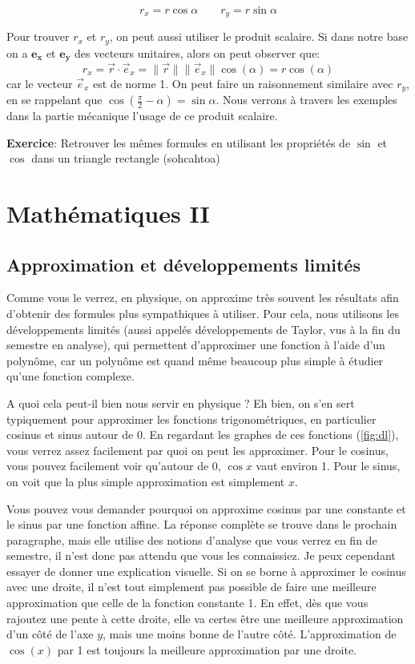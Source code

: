 \documentclass{article}
\begin{document}
\[\boxed{ r_x = r \cos{\alpha}\qquad r_y = r \sin{\alpha}} \]

\vspace{0.3cm}


\noindent Pour trouver $r_x$ et $r_y$, on peut aussi utiliser le produit scalaire. Si dans notre base on a $\mathbf{e_x}$ et $\mathbf{e_y}$ des vecteurs unitaires, alors on peut observer que:
\[r_x=\vec{r} \cdot \vec{e}_x=\lVert \vec{r}\rVert \lVert \vec{e}_x\rVert \cos{(\alpha)}=r\cos{(\alpha)}\]
car le vecteur $\vec{e}_x$ est de norme 1. On peut faire un raisonnement similaire avec $r_y$, en se rappelant que $\cos{(\frac{\pi}{2}-\alpha)} = \sin{\alpha}$. Nous verrons à travers les exemples dans la partie mécanique l'usage de ce produit scalaire. 



\noindent\textbf{Exercice}: Retrouver les mêmes formules en utilisant les propriétés de $\sin$ et $\cos$ dans un triangle rectangle (sohcahtoa)

\newpage

\section{Mathématiques II}

\subsection{Approximation et développements limités}
Comme vous le verrez, en physique, on approxime très souvent les résultats afin d'obtenir des formules plus sympathiques à utiliser.
Pour cela, nous utilisons les développements limités (aussi appelés développements de Taylor, vus à la fin du semestre en analyse), qui permettent d'approximer une fonction à l'aide d'un polynôme, car un polynôme est quand même beaucoup plus simple à étudier qu'une fonction complexe. 

A quoi cela peut-il bien nous servir en physique ? Eh bien, on s'en sert typiquement pour approximer les fonctions trigonométriques, en particulier cosinus et sinus autour de 0. En regardant les graphes de ces fonctions (\autoref{fig:dl}), vous verrez assez facilement par quoi on peut les approximer. Pour le cosinus, vous pouvez facilement voir qu'autour de 0, $\cos{x}$ vaut environ 1.  Pour le sinus, on voit que la plus simple approximation est simplement $x$. 

Vous pouvez vous demander pourquoi on approxime cosinus par une constante et le sinus par une fonction affine. La réponse complète se trouve dans le prochain paragraphe, mais elle utilise des notions d'analyse que vous verrez en fin de semestre, il n'est donc pas attendu que vous les connaissiez. Je peux cependant essayer de donner une explication visuelle. Si on se borne à approximer le cosinus avec une droite, il n'est tout simplement pas possible de faire une meilleure approximation que celle de la fonction constante 1. En effet, dès que vous rajoutez une pente à cette droite, elle va certes être une meilleure approximation d'un côté de l'axe $y$, mais une moins bonne de l'autre côté. L'approximation de $\cos(x)$ par 1 est toujours la meilleure approximation par une droite. 
\end{document}
